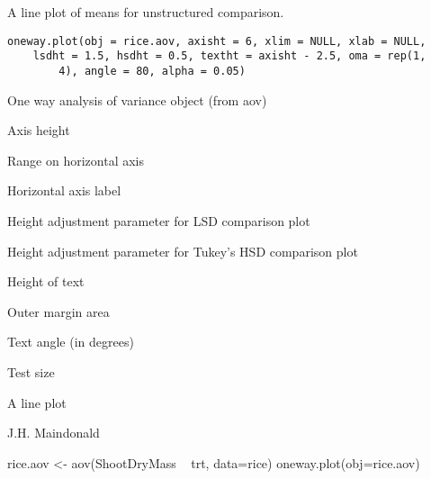 \begin{Description}\relax
A line plot of means for unstructured comparison.
\end{Description}
\begin{Usage}
\begin{verbatim}
oneway.plot(obj = rice.aov, axisht = 6, xlim = NULL, xlab = NULL,
    lsdht = 1.5, hsdht = 0.5, textht = axisht - 2.5, oma = rep(1,
        4), angle = 80, alpha = 0.05)
\end{verbatim}
\end{Usage}
\begin{Arguments}
\begin{ldescription}
\item[\code{obj}] One way analysis of variance object (from aov)
\item[\code{axisht}] Axis height
\item[\code{xlim}] Range on horizontal axis
\item[\code{xlab}] Horizontal axis label
\item[\code{lsdht}] Height adjustment parameter for LSD comparison plot
\item[\code{hsdht}] Height adjustment parameter for Tukey's HSD comparison 
plot
\item[\code{textht}] Height of text
\item[\code{oma}] Outer margin area
\item[\code{angle}] Text angle (in degrees)
\item[\code{alpha}] Test size
\end{ldescription}
\end{Arguments}
\begin{Value}
A line plot
\end{Value}
\begin{Author}\relax
J.H. Maindonald
\end{Author}
\begin{Examples}
\begin{ExampleCode}
rice.aov <- aov(ShootDryMass ~ trt, data=rice)
oneway.plot(obj=rice.aov)
\end{ExampleCode}
\end{Examples}

